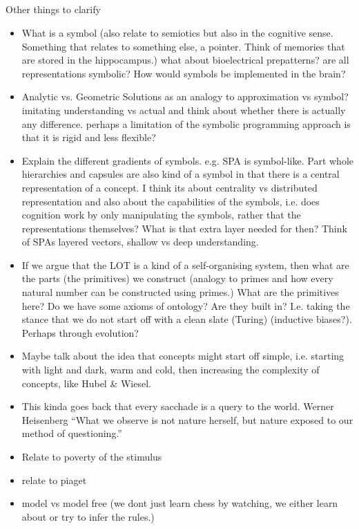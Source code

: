 \subsection{}
Other things to clarify
\begin{itemize}
    \item What is a symbol (also relate to semiotics but also in the cognitive sense. Something that relates to something else, a pointer. Think of memories that are stored in the hippocampus.) what about bioelectrical prepatterns? are all representations symbolic? How would symbols be implemented in the brain?
    \item Analytic vs. Geometric Solutions as an analogy to approximation vs symbol? imitating understanding vs actual and think about whether there is actually any difference. perhaps a limitation of the symbolic programming approach is that it is rigid and less flexible?
\end{itemize}
\begin{itemize}
    \item Explain the different gradients of symbols. e.g. SPA is symbol-like. Part whole hierarchies and capsules are also kind of a symbol in that there is a central representation of a concept. I think its about centrality vs distributed representation and also about the capabilities of the symbols, i.e. does cognition work by only manipulating the symbols, rather that the representations themselves? What is that extra layer needed for then? Think of SPAs layered vectors, shallow vs deep understanding.
    \item If we argue that the LOT is a kind of a self-organising system, then what are the parts (the primitives) we construct (analogy to primes and how every natural number can be constructed using primes.) What are the primitives here? Do we have some axioms of ontology? Are they built in? I.e. taking the stance that we do not start off with a clean slate (Turing) (inductive biases?). Perhaps through evolution? 
    \item Maybe talk about the idea that concepts might start off simple, i.e. starting with light and dark, warm and cold, then increasing the complexity of concepts, like Hubel \& Wiesel. 
    \item This kinda goes back that every sacchade is a query to the world. Werner Heisenberg “What we observe is not nature herself, but nature exposed to our method of questioning.” 
    \item Relate to poverty of the stimulus
    \item relate to piaget 
    \item model vs model free (we dont just learn chess by watching, we either learn about or try to infer the rules.)
\end{itemize}

